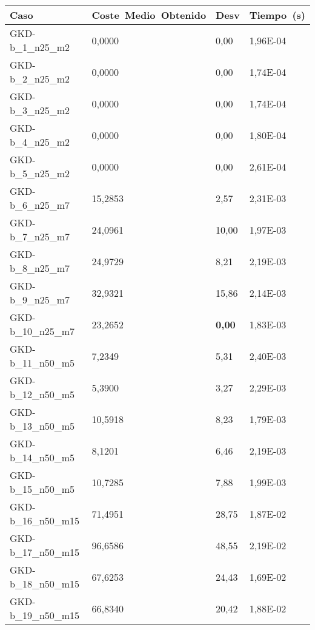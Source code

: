 \pagebreak

\begin{table}[!ht]%
    \centering    
    \begin{adjustbox}{height=12cm}
    \begin{tabular}{|l|l|l|l|}
    \hline
        Caso & Coste~Medio~Obtenido & Desv & Tiempo~(s) \\ \hline
        GKD-b\_1\_n25\_m2    & 0,0000   & 0,00          & 1,96E-04 \\ \hline
        GKD-b\_2\_n25\_m2    & 0,0000   & 0,00          & 1,74E-04 \\ \hline
        GKD-b\_3\_n25\_m2    & 0,0000   & 0,00          & 1,74E-04 \\ \hline
        GKD-b\_4\_n25\_m2    & 0,0000   & 0,00          & 1,80E-04 \\ \hline
        GKD-b\_5\_n25\_m2    & 0,0000   & 0,00          & 2,61E-04 \\ \hline
        GKD-b\_6\_n25\_m7    & 15,2853  & 2,57          & 2,31E-03 \\ \hline
        GKD-b\_7\_n25\_m7    & 24,0961  & 10,00         & 1,97E-03 \\ \hline
        GKD-b\_8\_n25\_m7    & 24,9729  & 8,21          & 2,19E-03 \\ \hline
        GKD-b\_9\_n25\_m7    & 32,9321  & 15,86         & 2,14E-03 \\ \hline
        GKD-b\_10\_n25\_m7   & 23,2652  & \textbf{0,00} & 1,83E-03 \\ \hline
        GKD-b\_11\_n50\_m5   & 7,2349   & 5,31          & 2,40E-03 \\ \hline
        GKD-b\_12\_n50\_m5   & 5,3900   & 3,27          & 2,29E-03 \\ \hline
        GKD-b\_13\_n50\_m5   & 10,5918  & 8,23          & 1,79E-03 \\ \hline
        GKD-b\_14\_n50\_m5   & 8,1201   & 6,46          & 2,19E-03 \\ \hline
        GKD-b\_15\_n50\_m5   & 10,7285  & 7,88          & 1,99E-03 \\ \hline
        GKD-b\_16\_n50\_m15  & 71,4951  & 28,75         & 1,87E-02 \\ \hline
        GKD-b\_17\_n50\_m15  & 96,6586  & 48,55         & 2,19E-02 \\ \hline
        GKD-b\_18\_n50\_m15  & 67,6253  & 24,43         & 1,69E-02 \\ \hline
        GKD-b\_19\_n50\_m15  & 66,8340  & 20,42         & 1,88E-02 \\ \hline

\end{tabular}
\end{adjustbox}
\end{table}
